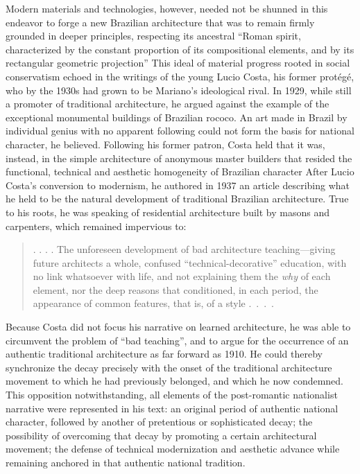 Modern materials and technologies, however, needed not be shunned in
this endeavor to forge a new Brazilian architecture that was to remain
firmly grounded in deeper principles, respecting its ancestral ``Roman
spirit, characterized by the constant proportion of its compositional
elements, and by its rectangular geometric projection''
\autocite[p.~124]{mariannofilho:1943margem} This ideal of material
progress rooted in social conservatism echoed in the writings of the
young Lucio Costa, his former protégé, who by the 1930s had grown to be
Mariano's ideological rival. In 1929, while still a promoter of
traditional architecture, he argued against the example of the
exceptional monumental buildings of Brazilian rococo. An art made in
Brazil by individual genius with no apparent following could not form
the basis for national character, he believed. Following his former
patron, Costa held that it was, instead, in the simple architecture of
anonymous master builders that resided the functional, technical and
aesthetic homogeneity of Brazilian character
\autocite[p.~22]{puppi:1998historia} After Lucio Costa's conversion to
modernism, he authored in 1937 an article describing what he held to be
the natural development of traditional Brazilian architecture. True to
his roots, he was speaking of residential architecture built by masons
and carpenters, which remained impervious to:

\begin{quote}
. . . . The unforeseen development of bad architecture teaching---giving
future architects a whole, confused ``technical-decorative'' education,
with no link whatsoever with life, and not explaining them the
\emph{why} of each element, nor the deep reasons that conditioned, in
each period, the appearance of common features, that is, of a style
.~.~.~. \autocite[p.~39]{costa:1937documentacao1}
\end{quote}

Because Costa did not focus his narrative on learned architecture, he
was able to circumvent the problem of ``bad teaching'', and to argue for
the occurrence of an authentic traditional architecture as far forward
as 1910. He could thereby synchronize the decay precisely with the onset
of the traditional architecture movement to which he had previously
belonged, and which he now condemned. This opposition notwithstanding,
all elements of the post-romantic nationalist narrative were represented
in his text: an original period of authentic national character,
followed by another of pretentious or sophisticated decay; the
possibility of overcoming that decay by promoting a certain
architectural movement; the defense of technical modernization and
aesthetic advance while remaining anchored in that authentic national
tradition.

